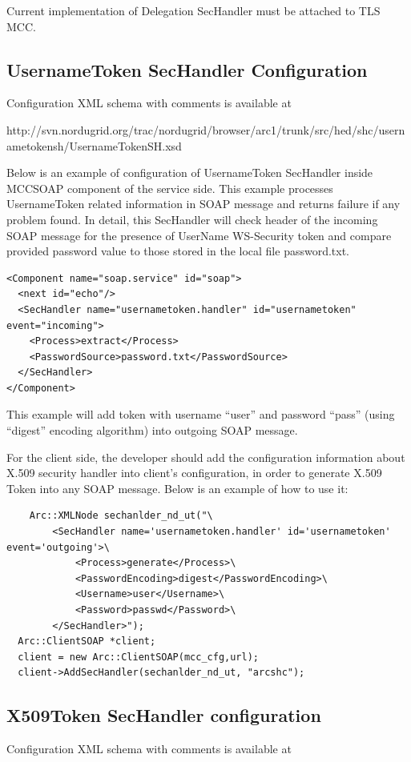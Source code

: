 \documentclass{article}                            %
\begin{document}
Current implementation of Delegation SecHandler must be attached to TLS MCC.


\subsection{UsernameToken SecHandler Configuration} %
\label{subsec:ut_sechandler_conf}
Configuration XML schema with comments is available at

http://svn.nordugrid.org/trac/nordugrid/browser/arc1/trunk/src/hed/shc/usernametokensh/UsernameTokenSH.xsd

Below is an example of configuration of UsernameToken SecHandler inside MCCSOAP component of the service side. This example processes UsernameToken related information in SOAP message and returns failure if any problem found. In detail, this SecHandler will check header of the incoming SOAP message for the presence of UserName WS-Security token and compare provided password value to those stored in the local file password.txt.

\begin{verbatim}
<Component name="soap.service" id="soap">
  <next id="echo"/>
  <SecHandler name="usernametoken.handler" id="usernametoken" event="incoming">
    <Process>extract</Process>
    <PasswordSource>password.txt</PasswordSource>
  </SecHandler>
</Component>
\end{verbatim}

This example will add token with username ``user'' and password ``pass'' (using ``digest'' encoding algorithm) into outgoing SOAP message.

For the client side, the developer should add the configuration information about X.509 security handler into client's configuration, in order to generate X.509 Token into any SOAP message. Below is an example of how to use it:

\begin{verbatim}
    Arc::XMLNode sechanlder_nd_ut("\
        <SecHandler name='usernametoken.handler' id='usernametoken' event='outgoing'>\
            <Process>generate</Process>\
            <PasswordEncoding>digest</PasswordEncoding>\
            <Username>user</Username>\
            <Password>passwd</Password>\
        </SecHandler>");
  Arc::ClientSOAP *client;
  client = new Arc::ClientSOAP(mcc_cfg,url);
  client->AddSecHandler(sechanlder_nd_ut, "arcshc");
\end{verbatim}

\subsection{X509Token SecHandler configuration} %
\label{subsec:xt_sechandler_conf}
Configuration XML schema with comments is available at
\end{document}
